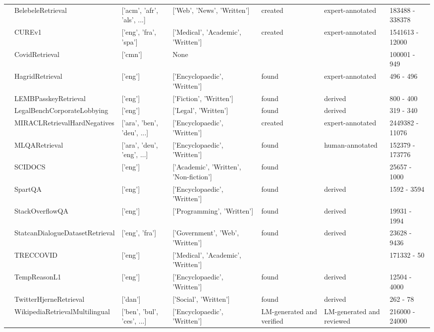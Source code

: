 \begin{table*}[!htb]
{\begin{tabular}{lllllll}
     & BelebeleRetrieval \cite{bandarkar2023belebele} & ['acm', 'afr', 'als', ...] & ['Web', 'News', 'Written'] & created & expert-annotated & 183488 - 338378 \\
     & CUREv1  & ['eng', 'fra', 'spa'] & ['Medical', 'Academic', 'Written'] & created & expert-annotated & 1541613 - 12000 \\
     & CovidRetrieval  & ['cmn'] & None & & & 100001 - 949 \\
     & HagridRetrieval \cite{hagrid} & ['eng'] & ['Encyclopaedic', 'Written'] & found & expert-annotated & 496 - 496 \\
     & LEMBPasskeyRetrieval \cite{zhu2024longembed} & ['eng'] & ['Fiction', 'Written'] & found & derived & 800 - 400 \\
     & LegalBenchCorporateLobbying \cite{guha2023legalbench} & ['eng'] & ['Legal', 'Written'] & found & derived & 319 - 340 \\
     & MIRACLRetrievalHardNegatives \cite{10.1162/tacl_a_00595} & ['ara', 'ben', 'deu', ...] & ['Encyclopaedic', 'Written'] & created & expert-annotated & 2449382 - 11076 \\
     & MLQARetrieval \cite{lewis2019mlqa} & ['ara', 'deu', 'eng', ...] & ['Encyclopaedic', 'Written'] & found & human-annotated & 152379 - 173776 \\
     & SCIDOCS \cite{specter2020cohan} & ['eng'] & ['Academic', 'Written', 'Non-fiction'] & found & & 25657 - 1000 \\
     & SpartQA \cite{xiao2024rar} & ['eng'] & ['Encyclopaedic', 'Written'] & found & derived & 1592 - 3594 \\
     & StackOverflowQA \cite{li2024coircomprehensivebenchmarkcode} & ['eng'] & ['Programming', 'Written'] & found & derived & 19931 - 1994 \\
     & StatcanDialogueDatasetRetrieval \cite{lu-etal-2023-statcan} & ['eng', 'fra'] & ['Government', 'Web', 'Written'] & found & derived & 23628 - 9436 \\
     & TRECCOVID \cite{roberts2021searching} & ['eng'] & ['Medical', 'Academic', 'Written'] & & & 171332 - 50 \\
     & TempReasonL1 \cite{xiao2024rar} & ['eng'] & ['Encyclopaedic', 'Written'] & found & derived & 12504 - 4000 \\
     & TwitterHjerneRetrieval \cite{holm2024gllms} & ['dan'] & ['Social', 'Written'] & found & derived & 262 - 78 \\
     & WikipediaRetrievalMultilingual  & ['ben', 'bul', 'ces', ...] & ['Encyclopaedic', 'Written'] & LM-generated and verified & LM-generated and reviewed & 216000 - 24000 \\

\end{tabular}}
\end{table*}
